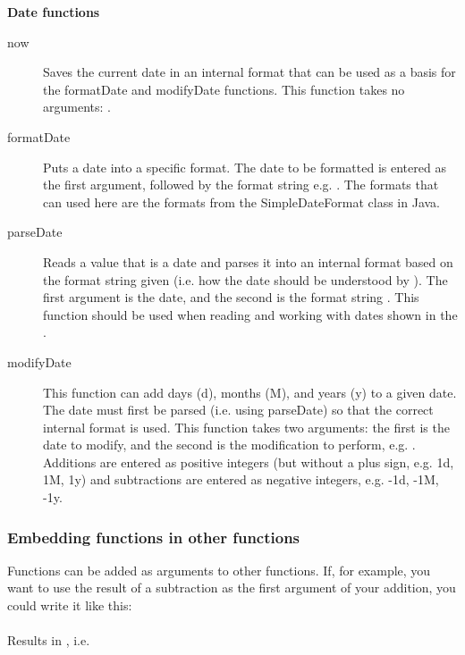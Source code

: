 \textbf{Date functions}\\
\begin{description}
\item [now]{Saves the current date in an internal format that can be used as a basis for the formatDate and modifyDate functions. This function takes no arguments: .}
\item [formatDate]{Puts a date into a specific format. The date to be formatted is entered as the first argument, followed by the format string e.g. . The formats that can used here are the formats from the SimpleDateFormat class in Java.}
\item [parseDate]{Reads a value that is a date and parses it into an internal format based on the format string given (i.e. how the date should be understood by \app{}). The first argument is the date, and the second is the format string  . This function should be used when reading and working with dates shown in the \gdaut{}. }
\item [modifyDate]{This function can add days (d), months (M), and years (y) to a given date. The date must first be parsed (i.e. using parseDate) so that the correct internal format is used. This function takes two arguments: the first is the date to modify, and the second is the modification to perform, e.g. . Additions are entered as positive integers (but without a plus sign, e.g. 1d, 1M, 1y) and subtractions are entered as negative integers, e.g. -1d, -1M, -1y.}
\end{description}

\subsubsection{Embedding functions in other functions}
Functions can be added as arguments to other functions. If, for example, you want to use the result of a subtraction as the first argument of your addition, you could write it like this:\\
\\
Results in , i.e. \\

